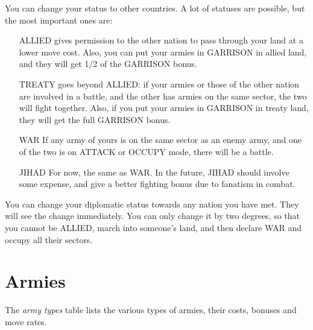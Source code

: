You can change your status to other countries.  A lot of statuses are
possible, but the most important ones are:
\begin{itemize}
\item[ALLIED]
gives permission to the other nation to pass through your land at a
lower move cost.  Also, you can put your armies in GARRISON in allied
land, and they will get 1/2 of the GARRISON bonus.
\item[TREATY]
goes beyond ALLIED: if your armies or those of the other nation are
involved in a battle, and the other has armies on the same sector, the
two will fight together.  Also, if you put your armies in GARRISON in
treaty land, they will get the full GARRISON bonus.
\item[WAR]
If any army of yours is on the same sector as an enemy army, and one
of the two is on ATTACK or OCCUPY mode, there will be a battle.
\item[JIHAD]
For now, the same as WAR.  In the future, JIHAD should involve some
expense, and give a better fighting bonus due to fanatism in combat.
\end{itemize}

You can change your diplomatic status towards any nation you have met.
They will see the change immediately.  You can only change it by two
degrees, so that you cannot be ALLIED, march into someone's land, and
then declare WAR and occupy all their sectors.

\section{Armies}
The \emph{army types} table lists the various types of armies, their
costs, bonuses and move rates.

